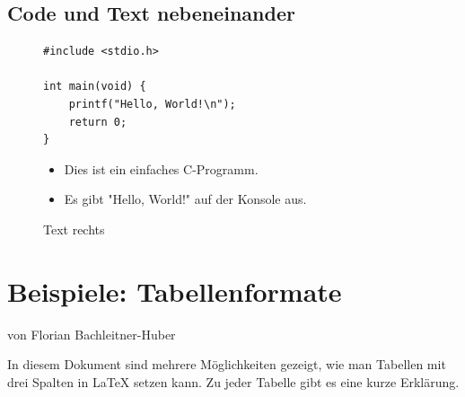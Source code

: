 \documentclass[a4paper,12pt]{article}
\begin{document}
\subsection{Code und Text nebeneinander}  %
\begin{figure}[!h]  %

  \centering  %
  \begin{minipage}[b]{0.55\textwidth}  %
    \centering  %
\begin{lstlisting}[style=cstyle]
#include <stdio.h>

int main(void) {
    printf("Hello, World!\n");
    return 0;
}
\end{lstlisting}
    \caption{Code links}  %
  \end{minipage}
  \begin{minipage}[b]{0.4\textwidth}  %
    \centering  %
    \begin{itemize}  %
      \item Dies ist ein einfaches C-Programm.  %
      \item Es gibt "Hello, World!" auf der Konsole aus.  %
    \end{itemize}
    \caption{Text rechts}  %
  \end{minipage}
\end{figure}



\newpage

\section{Beispiele: Tabellenformate}
{\large von Florian Bachleitner-Huber}

\vspace{1 cm}

In diesem Dokument sind mehrere Möglichkeiten gezeigt, wie man Tabellen mit drei Spalten in LaTeX setzen kann. Zu jeder Tabelle gibt es eine kurze Erklärung.
\end{document}
